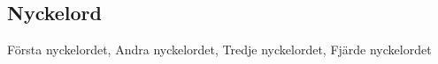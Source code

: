 \begin{scontents}[store-env=abstracts,print-env=true]

\end{scontents}
\subsection*{Nyckelord}
\begin{scontents}[store-env=keywords,print-env=true]
Första nyckelordet, Andra nyckelordet, Tredje nyckelordet, Fjärde nyckelordet
\end{scontents}
